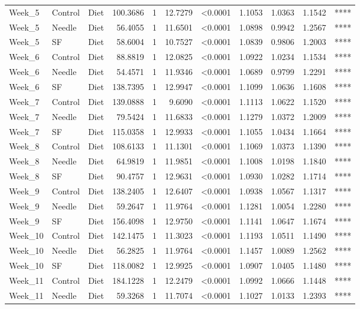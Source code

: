 \documentclass[
  12pt,
  letterpaper,
]{article}
\begin{document}
\begin{longtable}{lllrrrlrrrc}
Week\_5 & Control & Diet & 100.3686 & 1 & 12.7279 & <0.0001 & 1.1053 & 1.0363 & 1.1542 & **** \\ 
Week\_5 & Needle & Diet & 56.4055 & 1 & 11.6501 & <0.0001 & 1.0898 & 0.9942 & 1.2567 & **** \\ 
Week\_5 & SF & Diet & 58.6004 & 1 & 10.7527 & <0.0001 & 1.0839 & 0.9806 & 1.2003 & **** \\ 
Week\_6 & Control & Diet & 88.8819 & 1 & 12.0825 & <0.0001 & 1.0922 & 1.0234 & 1.1534 & **** \\ 
Week\_6 & Needle & Diet & 54.4571 & 1 & 11.9346 & <0.0001 & 1.0689 & 0.9799 & 1.2291 & **** \\ 
Week\_6 & SF & Diet & 138.7395 & 1 & 12.9947 & <0.0001 & 1.1099 & 1.0636 & 1.1608 & **** \\ 
Week\_7 & Control & Diet & 139.0888 & 1 & 9.6090 & <0.0001 & 1.1113 & 1.0622 & 1.1520 & **** \\ 
Week\_7 & Needle & Diet & 79.5424 & 1 & 11.6833 & <0.0001 & 1.1279 & 1.0372 & 1.2009 & **** \\ 
Week\_7 & SF & Diet & 115.0358 & 1 & 12.9933 & <0.0001 & 1.1055 & 1.0434 & 1.1664 & **** \\ 
Week\_8 & Control & Diet & 108.6133 & 1 & 11.1301 & <0.0001 & 1.1069 & 1.0373 & 1.1390 & **** \\ 
Week\_8 & Needle & Diet & 64.9819 & 1 & 11.9851 & <0.0001 & 1.1008 & 1.0198 & 1.1840 & **** \\ 
Week\_8 & SF & Diet & 90.4757 & 1 & 12.9631 & <0.0001 & 1.0930 & 1.0282 & 1.1714 & **** \\ 
Week\_9 & Control & Diet & 138.2405 & 1 & 12.6407 & <0.0001 & 1.0938 & 1.0567 & 1.1317 & **** \\ 
Week\_9 & Needle & Diet & 59.2647 & 1 & 11.9764 & <0.0001 & 1.1281 & 1.0054 & 1.2280 & **** \\ 
Week\_9 & SF & Diet & 156.4098 & 1 & 12.9750 & <0.0001 & 1.1141 & 1.0647 & 1.1674 & **** \\ 
Week\_10 & Control & Diet & 142.1475 & 1 & 11.3023 & <0.0001 & 1.1193 & 1.0511 & 1.1490 & **** \\ 
Week\_10 & Needle & Diet & 56.2825 & 1 & 11.9764 & <0.0001 & 1.1457 & 1.0089 & 1.2562 & **** \\ 
Week\_10 & SF & Diet & 118.0082 & 1 & 12.9925 & <0.0001 & 1.0907 & 1.0405 & 1.1480 & **** \\ 
Week\_11 & Control & Diet & 184.1228 & 1 & 12.2479 & <0.0001 & 1.0992 & 1.0666 & 1.1448 & **** \\ 
Week\_11 & Needle & Diet & 59.3268 & 1 & 11.7074 & <0.0001 & 1.1027 & 1.0133 & 1.2393 & **** \\ 

\end{longtable}
\end{document}
